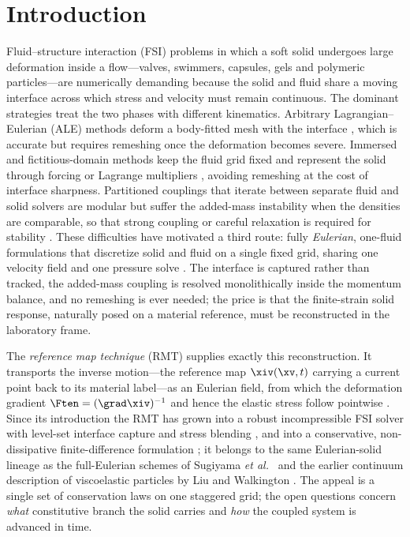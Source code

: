 \section{Introduction}
\label{sec:intro}

Fluid--structure interaction (FSI) problems in which a soft solid undergoes large
deformation inside a flow---valves, swimmers, capsules, gels and polymeric
particles---are numerically demanding because the solid and fluid share a moving
interface across which stress and velocity must remain continuous. The dominant
strategies treat the two phases with different kinematics. Arbitrary
Lagrangian--Eulerian (ALE) methods deform a body-fitted mesh with the interface
\cite{Donea1982,Hu2001}, which is accurate but requires remeshing once the
deformation becomes severe. Immersed and fictitious-domain methods keep the fluid
grid fixed and represent the solid through forcing or Lagrange multipliers
\cite{Peskin2002,Zhang2004}, avoiding remeshing at the cost of interface sharpness.
Partitioned couplings that iterate between separate fluid and solid solvers are
modular but suffer the added-mass instability when the densities are comparable, so
that strong coupling or careful relaxation is required for stability
\cite{Causin2005,Hou2012}. These difficulties have motivated a third route: fully
\emph{Eulerian}, one-fluid formulations that discretize solid and fluid on a single
fixed grid, sharing one velocity field and one pressure solve
\cite{Sugiyama2011,Ii2012,Cottet2008,Wick2013}. The interface is captured rather than
tracked, the added-mass coupling is resolved monolithically inside the momentum
balance, and no remeshing is ever needed; the price is that the finite-strain solid
response, naturally posed on a material reference, must be reconstructed in the
laboratory frame.

The \emph{reference map technique} (RMT) supplies exactly this reconstruction. It
transports the inverse motion---the reference map $\xiv(\xv,t)$ carrying a current
point back to its material label---as an Eulerian field, from which the deformation
gradient $\Ften=(\grad\xiv)^{-1}$ and hence the elastic stress follow pointwise
\cite{Kamrin2012,Valkov2015}. Since its introduction the RMT has grown into a robust
incompressible FSI solver with level-set interface capture and stress blending
\cite{Rycroft2020}, and into a conservative, non-dissipative finite-difference
formulation \cite{Jain2019}; it belongs to the same Eulerian-solid lineage as the
full-Eulerian schemes of Sugiyama \emph{et al.}\ \cite{Sugiyama2011,Sugiyama2010} and
the earlier continuum description of viscoelastic particles by Liu and Walkington
\cite{Liu2001}. The appeal is a single set of conservation laws on one staggered
grid; the open questions concern \emph{what} constitutive branch the solid carries and
\emph{how} the coupled system is advanced in time.

